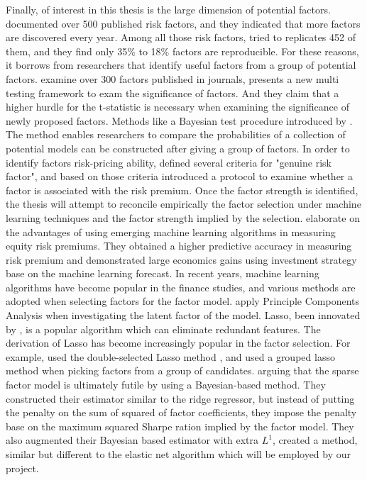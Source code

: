 Finally, of interest in this thesis is the large dimension of potential factors.
 documented over 500 published risk factors, and they indicated that more factors are discovered every year.
Among all those risk factors,  tried to replicates 452 of them, and they find only 35\% to 18\% factors are reproducible.
For these reasons, it borrows from researchers that identify useful factors from a group of potential factors.
 examine over 300 factors published in journals, presents a new multi testing framework to exam the significance of factors.
And they claim that a higher hurdle for the t-statistic is necessary when examining the significance of newly proposed factors.
Methods like a Bayesian test procedure introduced by .
The method enables researchers to compare the probabilities of a collection of potential models can be constructed after giving a group of factors.
In order to identify factors risk-pricing ability,  defined several criteria for "genuine risk factor", and based on those criteria introduced a protocol to examine whether a factor is associated with the risk premium.
Once the factor strength is identified, the thesis will attempt to reconcile empirically the factor selection under machine learning techniques and the factor strength implied by the selection.
 elaborate on the advantages of using emerging machine learning algorithms in measuring equity risk premiums.
They obtained a higher predictive accuracy in measuring risk premium and demonstrated large economics gains using investment strategy base on the machine learning forecast.
In recent years, machine learning algorithms have become popular in the finance studies, and various methods are adopted when selecting factors for the factor model.
 apply Principle Components Analysis when investigating the latent factor of the model. 
Lasso, been innovated by , is a popular algorithm which can eliminate redundant features. 
The derivation of Lasso has become increasingly popular in the factor selection.
For example,  used the double-selected Lasso method \cite{Belloni2014}, and  used a grouped lasso method \cite{Huang2010} when picking factors from a group of candidates. 
 arguing that the sparse factor model is ultimately futile by using a Bayesian-based method. 
They constructed their estimator similar to the ridge regressor, but instead of putting the penalty on the sum of squared of factor coefficients, they impose the penalty base on the maximum squared Sharpe ration implied by the factor model.
They also augmented their Bayesian based estimator with extra $L^1$, created a method,  similar but different to the elastic net algorithm which will be employed by our project. 
